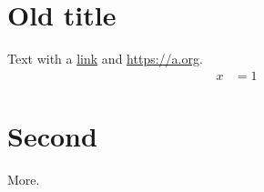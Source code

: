 \documentclass{article}
\begin{document}
\section{Old title}
Text with a \href{https://example.com}{link} and \url{https://a.org}.
\begin{align*}
  x &= 1
\end{align*}
\section{Second}
More.
\end{document}
